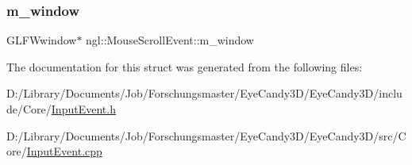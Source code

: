 \mbox{\label{structngl_1_1_mouse_scroll_event_a003ee76e6d0f5e574aa61e90c4b295e3}} 
\subsubsection{\texorpdfstring{m\+\_\+window}{m\_window}}
{\footnotesize\ttfamily G\+L\+F\+Wwindow$\ast$ ngl\+::\+Mouse\+Scroll\+Event\+::m\+\_\+window}



The documentation for this struct was generated from the following files\+:\begin{DoxyCompactItemize}
\item 
D\+:/\+Library/\+Documents/\+Job/\+Forschungsmaster/\+Eye\+Candy3\+D/\+Eye\+Candy3\+D/include/\+Core/\mbox{\hyperlink{_input_event_8h}{Input\+Event.\+h}}\item 
D\+:/\+Library/\+Documents/\+Job/\+Forschungsmaster/\+Eye\+Candy3\+D/\+Eye\+Candy3\+D/src/\+Core/\mbox{\hyperlink{_input_event_8cpp}{Input\+Event.\+cpp}}\end{DoxyCompactItemize}
